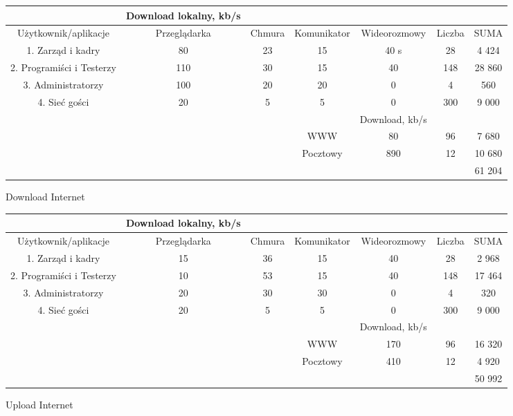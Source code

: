 \documentclass{article}
\begin{document}
\begin{Tabela}[!ht]
	\centering
	\begin{tabular}{|c|c|c|c|c|c|c} \hline
		& Download lokalny, kb/s \\
		\hline
		Użytkownik/aplikacje & Przeglądarka& Chmura & Komunikator & Wideorozmowy & Liczba &SUMA\\
		\hline
		1. Zarząd i kadry  & 80 & 23 & 15 & 40 s& 28 & 4 424\\
		2. Programiści i Testerzy & 110 & 30 & 15 & 40 & 148 & 28 860\\
		3. Administratorzy & 100 & 20 & 20 & 0 & 4 & 560\\
		4. Sieć gości & 20 & 5 & 5 & 0 & 300 & 9 000\\
		\hline
		\hline
		&&&&Download, kb/s && \\
		\hline
		&&& WWW & 80 & 96 & 7 680\\
		&&& Pocztowy & 890 & 12 & 10 680\\
		&&&&&&61 204\\
		\hline
	\end{tabular}
	\caption{Download Internet}
\end{Tabela}
\begin{Tabela}[!ht]
	\centering
	\begin{tabular}{|c|c|c|c|c|c|c} \hline
		& Download lokalny, kb/s \\
		\hline
		Użytkownik/aplikacje & Przeglądarka& Chmura & Komunikator & Wideorozmowy & Liczba &SUMA\\
		\hline
		1. Zarząd i kadry  & 15 & 36 & 15 & 40 & 28 & 2 968\\
		2. Programiści i Testerzy & 10 & 53 & 15 & 40 & 148 & 17 464\\
		3. Administratorzy & 20 & 30 & 30 & 0 & 4 & 320\\
		4. Sieć gości & 20 & 5 & 5 & 0 & 300 & 9 000\\
		\hline
		\hline
		&&&&Download, kb/s && \\
		\hline
		&&& WWW & 170 & 96 & 16 320\\
		&&& Pocztowy &410 & 12 & 4 920\\
		&&&&&&50 992\\
		\hline
	\end{tabular}
	\caption{Upload Internet}
\end{Tabela}

\newpage
\end{document}
